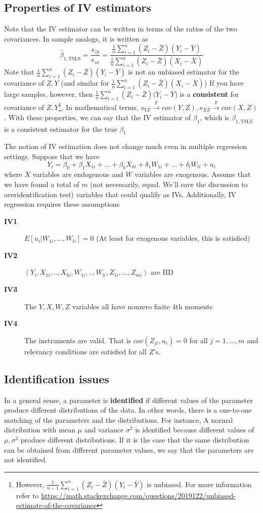 \documentclass[12pt]{article}
\theoremstyle{definition}
\theoremstyle{property}
\theoremstyle{assumption}
\theoremstyle{example}
\theoremstyle{comment}
\begin{document}
\subsection{Properties of IV estimators}
Note that the IV estimator can be written in terms of the ratios of the two covariances. In sample analogs, it is written as
\[
\hat{\beta}_{1,\text{TSLS}}=\frac{s_{zy}}{s_{zx}}=\frac{\frac{1}{n}\sum_{i=1}^n(Z_i-\bar{Z})(Y_i-\bar{Y})}{\frac{1}{n}\sum_{i=1}^n(Z_i-\bar{Z})(X_i-\bar{X})}
\]
Note that $\frac{1}{n}\sum_{i=1}^n(Z_i-\bar{Z})(Y_i-\bar{Y})$ is not an unbiased estimator for the covariance of $Z,Y$ (and similar for $\frac{1}{n}\sum_{i=1}^n(Z_i-\bar{Z})(X_i-\bar{X})$) If you have large samples, however, then $\frac{1}{n}\sum_{i=1}^n(Z_i-\bar{Z})(Y_i-\bar{Y}$) is a \textbf{consistent} for covariance of $Z,Y$\footnote{However, $\frac{1}{n-1}\sum_{i=1}^n(Z_i-\bar{Z})(Y_i-\bar{Y})$ is unbiased. For more information refer to \url{https://math.stackexchange.com/questions/2019122/unbiased-estimate-of-the-covariance}}. In mathematical terms, $s_{YZ}\xrightarrow{p} cov(Y,Z),  s_{XZ}\xrightarrow{p} cov(X,Z)$. With these properties, we can say that the IV estimator of $\beta_1$, which is $\hat{\beta}_{1,\text{TSLS}}$ is a consistent estimator for the true $\beta_1$ \par\medskip

The notion of IV estimation does not change much even in multiple regression settings. Suppose that we have
\[
Y_i = \beta_0 + \beta_1X_{1i} +...+ \beta_kX_{ki} + \delta_1W_{1i}+...+\delta_lW_{li}+u_i 
\]
where $X$ variables are endogenous and $W$ variables are exogenous. Assume that we have found a total of $m$ (not necessarily, equal. We'll save the discussion to overidentification test) variables that could qualify as IVs. Additionally, IV regression requires these assumptions 
\begin{description}
\item[\textbf{IV1}] $E[u_i|W_{1i},...,W_{li}]=0$ (At least for exogenous variables, this is satisfied)
\item[\textbf{IV2}] $(Y_i,X_{1i},..,X_{ki},W_{1i},..,W_{li},Z_{1i},...,Z_{mi})$ are IID
\item[\textbf{IV3}] The $Y,X,W,Z$ variables all have nonzero finite 4th moments
\item[\textbf{IV4}] The instruments are valid. That is $cov(Z_{ji},u_i)=0$ for all $j=1,...,m$ and relevancy conditions are satisfied for all $Z$'s. 
\end{description}
\subsection{Identification issues}
In a general sense, a parameter is \textbf{identified} if different values of the parameter produce different distributions of the data. In other words, there is a one-to-one matching of the parameters and the distributions. For instance, A normal distribution with mean $\mu$ and variance $\sigma^2$ is identified because different values of $\mu, \sigma^2$ produce different distributions. If it is the case that the same distribution can be obtained from different parameter values, we say that the parameters are not identified. \par\medskip
\end{document}
